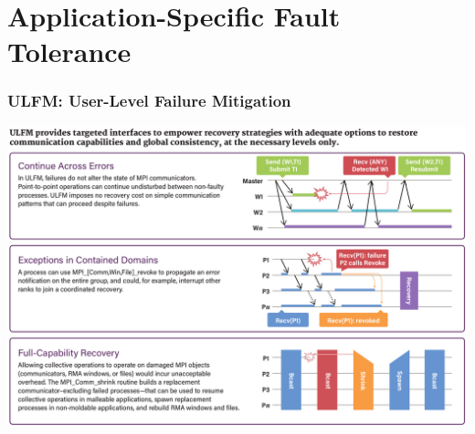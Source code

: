 \section{Application-Specific Fault Tolerance}

\begin{frame}
  \frametitle{ULFM: User-Level Failure Mitigation}

  \centering\includegraphics[height=.85\textheight]{ulfm.png}

\end{frame}


\newcommand{\processes}{\ensuremath{{\mathcal P}}}
\newcommand{\status}[2]{\ensuremath{S_{#1}^{#2}}}
\newcommand{\emitter}{\ensuremath{\texttt{emitter}}\xspace}
\newcommand{\observer}{\ensuremath{\texttt{observer}}\xspace}
\newcommand{\alive}{\ensuremath{\texttt{alive}}\xspace}
\newcommand{\dead}{\ensuremath{\texttt{dead}}}
\newcommand{\heartbeat}{\ensuremath{\textsc{heartbeat}}\xspace}
\newcommand{\timeoutping}{\ensuremath{\textsc{HB-Timeout}}\xspace}
\newcommand{\timeoutsuspect}{\ensuremath{\textsc{Susp-Timeout}}\xspace}
\newcommand{\timeout}[1]{\ensuremath{\textsc{Timeout}_{#1}}\xspace}
\newcommand{\newobserver}{\ensuremath{\textsc{NewObserver}}\xspace}
\newcommand{\findpred}{\ensuremath{\textit{FindEmitter}}\xspace}
\newcommand{\neighbors}{\ensuremath{\textit{Neighbors}}\xspace}
\newcommand{\broadcastmsg}{\ensuremath{\textsc{BcastMsg}}\xspace}
\newcommand{\pinginterval}{\ensuremath{\eta}\xspace}
\newcommand{\msgtime}{\ensuremath{\tau}\xspace}
\newcommand{\suspectinterval}{\ensuremath{\delta}\xspace}
\newcommand{\emittors}[1]{\ensuremath{M(#1)}}
\newcommand{\ringemittor}[1]{\ensuremath{M_R(#1)}}
\newcommand{\additionalemittors}[1]{\ensuremath{M_A(#1)}}
\newcommand{\receivers}[1]{\ensuremath{O(#1)}}
\newcommand{\ringreceiver}[1]{\ensuremath{O_R(#1)}}
\newcommand{\additionalreceivers}[1]{\ensuremath{O_A(#1)}}
\newcommand{\transfer}[2]{\ensuremath{T_{#1,#2}}}
\newcommand{\deadmsg}[1]{\ensuremath{\texttt{DeadMsg(\ensuremath{#1})}}}
\newcommand{\broadcastneighbors}[1]{\ensuremath{\mathcal B}_{#1}}
\newcommand{\deads}[1]{\ensuremath{{\mathcal D}_{#1}}}
\newcommand{\muind}{\ensuremath{\mu_{\text{ind}}}}
\newcommand{\ringalgorithm}{\textsc{RingAlgorithm}}

